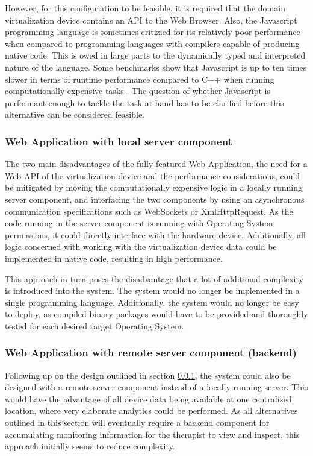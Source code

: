 However, for this configuration to be feasible, it is required that the domain virtualization device contains an API to the Web Browser. Also, the Javascript programming language is sometimes critizied for its relatively poor performance when compared to programming languages with compilers capable of producing native code. This is owed in large parts to the dynamically typed and interpreted nature of the language. Some benchmarks show that Javascript is up to ten times slower in terms of runtime performance compared to C++ when running computationally expensive tasks \cite{BenchmarksGame}. The question of whether Javascript is performant enough to tackle the task at hand has to be clarified before this alternative can be considered feasible.
\subsubsection{Web Application with local server component}
\label{sec:alt:thin-web-app}
The two main disadvantages of the fully featured Web Application, the need for a Web API of the virtualization device and the performance considerations, could be mitigated by moving the computationally expensive logic in a locally running server component, and interfacing the two components by using an asynchronous communication specifications such as WebSockets or XmlHttpRequest. As the code running in the server component is running with Operating System permissions, it could directly interface with the hardware device. Additionally, all logic concerned with working with the virtualization device data could be implemented in native code, resulting in high performance.

This approach in turn poses the disadvantage that a lot of additional complexity is introduced into the system. The system would no longer be implemented in a single programming language. Additionally, the system would no longer be easy to deploy, as compiled binary packages would have to be provided and thoroughly tested for each desired target Operating System.
\subsubsection{Web Application with remote server component (backend)}
\label{sec:alt:thin-remote-web-app}
Following up on the design outlined in section \ref{sec:alt:thin-web-app}, the system could also be designed with a remote server component instead of a locally running server. This would have the advantage of all device data being available
at one centralized location, where very elaborate analytics could be performed. As all alternatives outlined in this section will eventually require a backend component for accumulating monitoring information for the therapist to view and inspect, this approach initially seems to reduce complexity.

